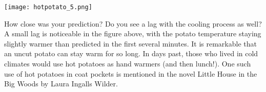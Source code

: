 \documentclass{ximera}
\begin{document}
\begin{image}
\texttt{[image: hotpotato\_5.png]}
\end{image}

How close was your prediction?  Do you see a lag with the cooling process as well?  A small lag is noticeable in the figure above, with the potato temperature staying slightly warmer than predicted in the first several minutes.  It is remarkable that an uncut potato can stay warm for so long.  In days past, those who lived in cold climates would use hot potatoes as hand warmers (and then lunch!).  One such use of hot potatoes in coat pockets is mentioned in the novel Little House in the Big Woods by Laura Ingalls Wilder.
\end{document}
